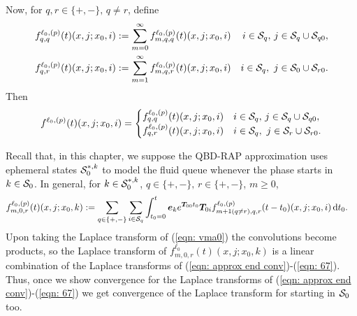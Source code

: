 Now, for \(q,r\in\{+,-\},\, q\neq r\), define  
\begin{align*}
	f^{\ell_0,(p)}_{q,q}(t)(x,j;x_0,i)  &:= \sum_{m=0}^\infty f^{\ell_0,(p)}_{m,q,q}(t)(x,j;x_0,i)  & i\in\mathcal{S}_q,\,j\in\mathcal{S}_q\cup\mathcal{S}_{q0},
	\\ f^{\ell_0,(p)}_{q,r}(t)(x,j;x_0,i)  &:= \sum_{m=1}^\infty f^{\ell_0,(p)}_{m,q,r}(t)(x,j;x_0,i)  & i\in\mathcal S_q,\,\,j\in\mathcal S_{0}\cup\mathcal{S}_{r0}.
\end{align*}
Then 
\begin{align}
	f^{\ell_0,(p)}(t)(x,j;x_0,i)  = \begin{cases}
		 f^{\ell_0,(p)}_{q,q}(t)(x,j;x_0,i)  & i\in\mathcal{S}_q,\,j\in\mathcal{S}_q\cup\mathcal{S}_{q0},
	\\    f^{\ell_0,(p)}_{q,r}(t)(x,j;x_0,i)  & i\in\mathcal S_q,\,\,j\in\mathcal S_{r}\cup\mathcal{S}_{r0}.
	\end{cases}\label{eqn:ghghghghggg}
\end{align}

Recall that, in this chapter, we suppose the QBD-RAP approximation uses ephemeral states \(\mathcal{S}_0^{*,k}\) to model the fluid queue whenever the phase starts in \(k\in\mathcal{S}_0\). In general, for \(k\in\mathcal{S}_0^{*,k}\), \(q\in \{+,-\}, \, r\in\{+,-\}\), \(m\geq 0\),
\begin{align}
	f_{m,0,r}^{\ell_0,(p)}(t)(x,j;x_0,k)  
	&:= \sum_{q\in\{+,-\}}\sum_{i\in\mathcal{S}_q}\int_{t_0=0}^t \boldsymbol e_ke^{\boldsymbol T_{00}t_0} \boldsymbol T_{0i} f_{m+1(q\neq r),q,r}^{\ell_0,(p)}(t-t_0)(x,j;x_0,i)\, \mathrm{d} t_0 . \label{eqn: vma0}
\end{align}
Upon taking the Laplace transform of (\ref{eqn: vma0}) the convolutions become products, so the Laplace transform of \(f_{m,0,r}^{\ell_0}(t)(x,j;x_0,k)\) is a linear combination of the Laplace transforms of (\ref{eqn: approx end conv})-(\ref{eqn: 67}). Thus, once we show convergence for the Laplace transforms of (\ref{eqn: approx end conv})-(\ref{eqn: 67}) we get convergence of the Laplace transform for starting in \(\mathcal{S}_0\) too. 


